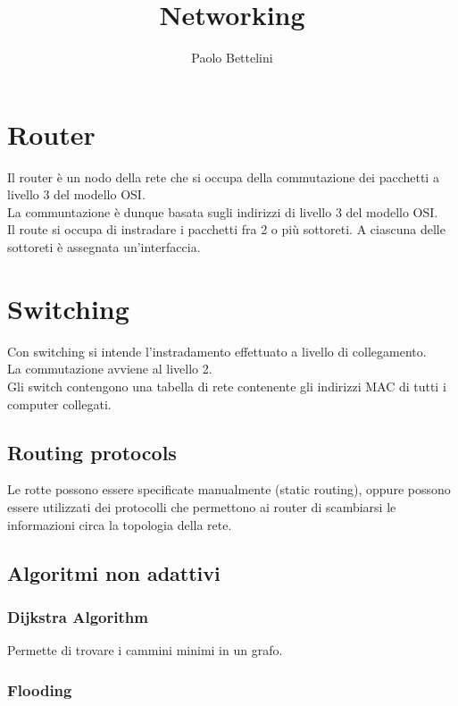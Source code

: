 \documentclass{article}
\title{Networking}
\author{Paolo Bettelini}
\date{}
\begin{document}
\maketitle
\tableofcontents
\pagebreak

\section{Router}

Il router è un nodo della rete che si occupa della commutazione dei pacchetti
a livello 3 del modello OSI.
\\
La communtazione è dunque basata sugli indirizzi
di livello 3 del modello OSI.
\\
Il route si occupa di instradare i pacchetti fra 2 o più sottoreti.
A ciascuna delle sottoreti è assegnata un'interfaccia.

\section{Switching}

Con switching si intende l'instradamento effettuato
a livello di collegamento.
\\
La commutazione
avviene al livello 2.
\\
Gli switch contengono una tabella di rete
contenente gli indirizzi MAC di tutti i computer
collegati.


\subsection{Routing protocols}
Le rotte possono essere specificate manualmente
(static routing), oppure possono essere utilizzati
dei protocolli che permettono ai router di scambiarsi
le informazioni circa la topologia della rete.

\subsection{Algoritmi non adattivi}

\subsubsection{Dijkstra Algorithm}

Permette di trovare i cammini minimi in un grafo.

\subsubsection{Flooding}
\end{document}
